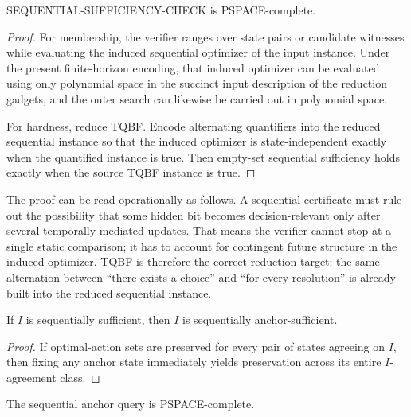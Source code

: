 \begin{theorem}\label{thm:sequential-pspace}
SEQUENTIAL-SUFFICIENCY-CHECK is PSPACE-complete.
\end{theorem}


\begin{proof}
For membership, the verifier ranges over state pairs or candidate witnesses while evaluating the induced sequential optimizer of the input instance. Under the present finite-horizon encoding, that induced optimizer can be evaluated using only polynomial space in the succinct input description of the reduction gadgets, and the outer search can likewise be carried out in polynomial space.

For hardness, reduce TQBF. Encode alternating quantifiers into the reduced sequential instance so that the induced optimizer is state-independent exactly when the quantified instance is true. Then empty-set sequential sufficiency holds exactly when the source TQBF instance is true.
\end{proof}

The proof can be read operationally as follows. A sequential certificate must rule out the possibility that some hidden bit becomes decision-relevant only after several temporally mediated updates. That means the verifier cannot stop at a single static comparison; it has to account for contingent future structure in the induced optimizer. TQBF is therefore the correct reduction target: the same alternation between ``there exists a choice'' and ``for every resolution'' is already built into the reduced sequential instance.

\begin{proposition}\label{prop:sequential-anchor-refinement}
If $I$ is sequentially sufficient, then $I$ is sequentially anchor-sufficient.
\end{proposition}


\begin{proof}
If optimal-action sets are preserved for every pair of states agreeing on $I$, then fixing any anchor state immediately yields preservation across its entire $I$-agreement class.
\end{proof}

\begin{theorem}\label{thm:sequential-anchor-hard}
The sequential anchor query is PSPACE-complete.
\end{theorem}


